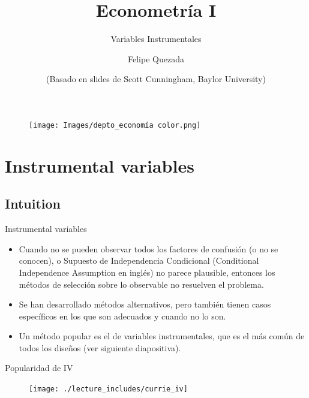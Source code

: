 \documentclass{beamer}
\title[Econometría I]{Econometría I}
\subtitle{Variables Instrumentales}
\author[Felipe Quezada]{Felipe Quezada}
\date{(Basado en slides de Scott Cunningham, Baylor University)}
\begin{document}
\begin{frame}[plain]
\begin{figure}
    \hspace{-8.75cm} \texttt{[image: Images/depto\_economía color.png]}
    \textbf{}
\end{figure}
\vspace{-15pt}
\titlepage
\end{frame}



\section{Instrumental variables}

\subsection{Intuition}

\begin{frame}{Instrumental variables}

\begin{itemize}
\item Cuando no se pueden observar todos los factores de confusión (o no se conocen), o Supuesto de Independencia Condicional (Conditional Independence Assumption en inglés) no parece plausible, entonces los métodos de selección sobre lo observable no resuelven el problema.
\item Se han desarrollado métodos alternativos, pero también tienen casos específicos en los que son adecuados y cuando no lo son.
\item Un método popular es el de variables instrumentales, que es el más común de todos los diseños (ver siguiente diapositiva).
\end{itemize}

\end{frame}

\begin{frame}{Popularidad de IV}

	\begin{figure}
	\texttt{[image: ./lecture\_includes/currie\_iv]}
	\end{figure}
	
\end{frame}
\end{document}
